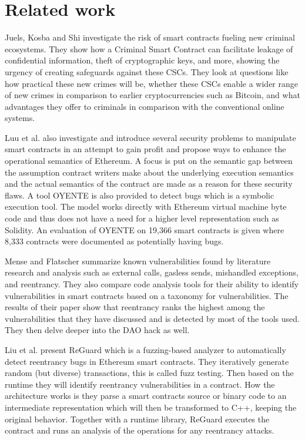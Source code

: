 \documentclass[10pt,conference]{IEEEtran}
\begin{document}
\section{Related work}\label{sec:related-work}


Juels, Kosba and Shi\cite{criminal} investigate the risk of smart contracts fueling new criminal ecosystems. They show how a Criminal Smart Contract can facilitate leakage of confidential information, theft of cryptographic keys, and more, showing the urgency of creating safeguards against these CSCs. They look at questions like how practical these new crimes will be, whether these CSCs enable a wider range of new crimes in comparison to earlier cryptocurrencies such as Bitcoin, and what advantages they offer to criminals in comparison with the conventional online systems.


Luu et al.  \cite{smarter} also investigate and introduce several security problems to manipulate smart contracts in an attempt to gain profit and propose ways to enhance the operational semantics of Ethereum. A focus is put on the semantic gap between the assumption contract writers make about the underlying execution semantics and the actual semantics of the contract are made as a reason for these security flaws. A tool OYENTE is also provided to detect bugs which is a symbolic execution tool. The model works directly with Ethereum virtual machine byte code and thus does not have a need for a higher level representation such as Solidity. An evaluation of OYENTE on 19,366 smart contracts is given where 8,333 contracts were documented as potentially having bugs.

Mense and Flatscher \cite{security} summarize known vulnerabilities found by literature research and analysis such as external calls, gasless sends, mishandled exceptions, and reentrancy. They also compare code analysis tools for their ability to identify vulnerabilities in smart contracts based on a taxonomy for vulnerabilities. The results of their paper show that reentrancy ranks the highest among the vulnerabilities that they have discussed and is detected by most of the tools used. They then delve deeper into the DAO hack as well.


Liu et al. \cite{reguard} present ReGuard which is a fuzzing-based analyzer to automatically detect reentrancy bugs in Ethereum smart contracts. They iteratively generate random (but diverse) transactions, this is called fuzz testing. Then based on the runtime they will identify reentrancy vulnerabilities in a contract. How the architecture works is they parse a smart contracts source or binary code to an intermediate representation which will then be transformed to C++, keeping the original behavior. Together with a runtime library, ReGuard executes the contract and runs an analysis of the operations for any reentrancy attacks.
\end{document}
